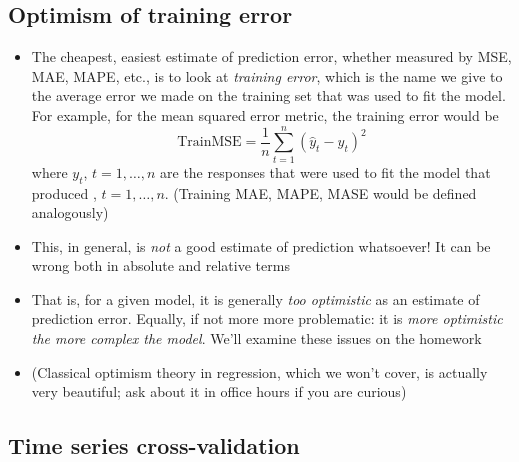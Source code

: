 \documentclass{article}
\begin{document}
\subsection{Optimism of training error}

\def\TrainMSE{\mathrm{TrainMSE}}

\begin{itemize}
\item The cheapest, easiest estimate of prediction error, whether measured by
  MSE, MAE, MAPE, etc., is to look at \emph{training error}, which is the name
  we give to the average error we made on the training set that was used to fit
  the model. For example, for the mean squared error metric, the training error
  would be
  \[
  \TrainMSE = \frac{1}{n} \sum_{t=1}^n (\hat{y}_t - y_t)^2
  \]
  where $y_t$, $t = 1,\dots,n$ are the responses that were used to fit the model
  that produced , $t = 1,\dots,n$. (Training MAE, MAPE, MASE 
  would be defined analogously)

\item This, in general, is \emph{not} a good estimate of prediction
  whatsoever! It can be wrong both in absolute and relative terms

\item That is, for a given model, it is generally \emph{too optimistic} as an
  estimate of prediction error. Equally, if not more more problematic: it is
  \emph{more optimistic the more complex the model}. We'll examine these issues
  on the homework 

\item (Classical optimism theory in regression, which we won't cover, is
  actually very beautiful; ask about it in office hours if you are curious) 
\end{itemize}

\subsection{Time series cross-validation}

\def\SplitMSE{\mathrm{SplitMSE}} 
\def\CVMSE{\mathrm{CVMSE}}
\end{document}
